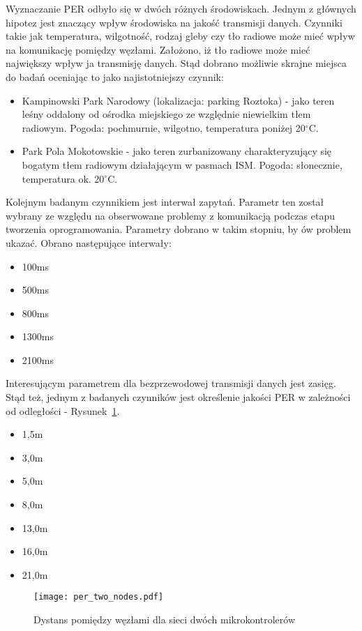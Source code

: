 Wyznaczanie PER odbyło się w dwóch różnych środowiskach. Jednym z głównych hipotez jest znaczący wpływ
środowiska na jakość transmisji danych. Czynniki takie jak temperatura, wilgotność, rodzaj gleby czy
tło radiowe może mieć wpływ na komunikację pomiędzy węzłami. Założono, iż tło radiowe może mieć
największy wpływ ja transmisję danych. Stąd dobrano możliwie skrajne miejsca do badań oceniając
to jako najistotniejszy czynnik:
\begin{itemize}
\item Kampinowski Park Narodowy (lokalizacja: parking Roztoka) - jako teren leśny oddalony od ośrodka miejskiego
ze względnie niewielkim tłem radiowym. Pogoda: pochmurnie, wilgotno, temperatura poniżej 20$^{\circ}$C.
\item Park Pola Mokotowskie - jako teren zurbanizowany charakteryzujący się bogatym tłem radiowym działającym
w pasmach \gls{ISM}. Pogoda: słonecznie, temperatura ok. 20$^{\circ}$C.
\end{itemize}

Kolejnym badanym czynnikiem jest interwał zapytań. Parametr ten został wybrany ze względu na obserwowane
problemy z komunikacją podczas etapu tworzenia oprogramowania. Parametry dobrano w takim stopniu, by ów problem
ukazać. Obrano następujące interwały:
\begin{itemize} \label {items:ping_intervals}
\item 100ms
\item 500ms
\item 800ms
\item 1300ms
\item 2100ms
\end{itemize}

Interesującym parametrem dla bezprzewodowej transmisji danych jest zasięg. Stąd też, jednym z badanych czynników jest
określenie jakości PER w zależności od odległości - Rysunek~\ref{rys:two_nodes_setup}.
\begin{itemize}
\item 1,5m
\item 3,0m
\item 5,0m
\item 8,0m
\item 13,0m
\item 16,0m
\item 21,0m
\end{itemize}

\begin{figure}[!ht]
	\centering \texttt{[image: per\_two\_nodes.pdf]} 
	\caption{Dystans pomiędzy węzłami dla sieci dwóch mikrokontrolerów}
	\label{rys:two_nodes_setup}
\end{figure}

